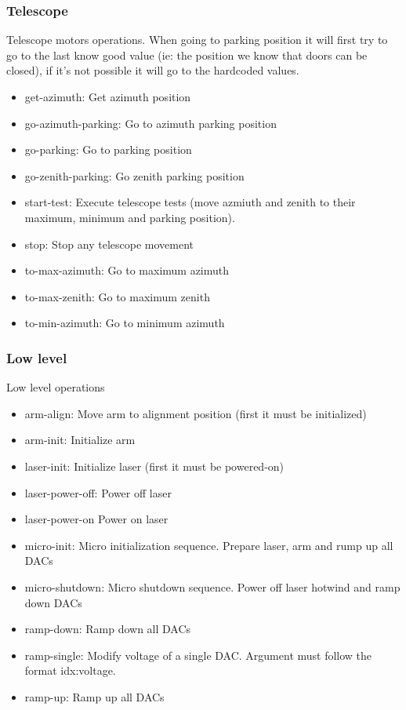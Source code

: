 \documentclass[letterpaper, 10 pt]{article}
\begin{document}
\subsubsection{Telescope}
Telescope motors operations. When going to parking position it will first try to go to the last know good value (ie: the position we know that doors can be closed), if it's not possible it will go to the hardcoded values.
\begin{itemize}
	\item get-azimuth: Get azimuth position
	\item go-azimuth-parking: Go to azimuth parking position
	\item go-parking: Go to parking position
	\item go-zenith-parking: Go zenith parking position
	\item start-test: Execute telescope tests (move azmiuth and zenith to their maximum, minimum and parking position).
	\item stop: Stop any telescope movement
	\item to-max-azimuth: Go to maximum azimuth
	\item to-max-zenith: Go to maximum zenith
	\item to-min-azimuth: Go to minimum azimuth		
\end{itemize}
\subsubsection{Low level}
Low level operations
\begin{itemize}
	\item arm-align: Move arm to alignment position (first it must be initialized)
	\item arm-init: Initialize arm
	\item laser-init: Initialize laser (first it must be powered-on)
	\item laser-power-off: Power off laser
	\item laser-power-on Power on laser
	\item micro-init: Micro initialization sequence. Prepare laser, arm and rump up all DACs
	\item micro-shutdown: Micro shutdown sequence. Power off laser hotwind and ramp down DACs
	\item ramp-down: Ramp down all DACs
	\item ramp-single: Modify voltage of a single DAC. Argument must follow the format idx:voltage.
	\item ramp-up: Ramp up all DACs
\end{itemize}
\end{document}
